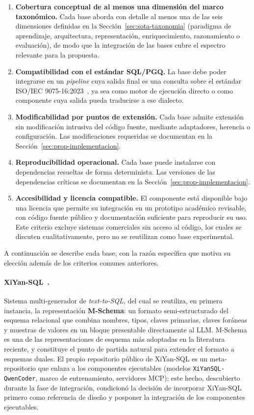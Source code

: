 \begin{enumerate}
    \item \textbf{Cobertura conceptual de al menos una dimensión del marco taxonómico.} Cada base aborda con detalle al menos una de las seis dimensiones definidas en la Sección~\ref{sec:sota-taxonomia} (paradigma de aprendizaje, arquitectura, representación, enriquecimiento, razonamiento o evaluación), de modo que la integración de las bases cubre el espectro relevante para la propuesta.
    \item \textbf{Compatibilidad con el estándar \ac{SQL}/\ac{PGQ}.} La base debe poder integrarse en un \emph{pipeline} cuya salida final es una consulta sobre el estándar ISO/IEC 9075-16:2023~\cite{ISO9075_16_2023}, ya sea como motor de ejecución directo o como componente cuya salida pueda traducirse a ese dialecto.
    \item \textbf{Modificabilidad por puntos de extensión.} Cada base admite extensión sin modificación intrusiva del código fuente, mediante adaptadores, herencia o configuración. Las modificaciones requeridas se documentan en la Sección~\ref{sec:prop-implementacion}.
    \item \textbf{Reproducibilidad operacional.} Cada base puede instalarse con dependencias resueltas de forma determinista. Las versiones de las dependencias críticas se documentan en la Sección~\ref{sec:prop-implementacion}.
    \item \textbf{Accesibilidad y licencia compatible.} El componente está disponible bajo una licencia que permite su integración en un prototipo académico revisable, con código fuente público y documentación suficiente para reproducir su uso. Este criterio excluye sistemas comerciales sin acceso al código, los cuales se discuten cualitativamente, pero no se reutilizan como base experimental.
\end{enumerate}

A continuación se describe cada base, con la razón específica que motiva su elección además de los criterios comunes anteriores.

\paragraph{XiYan-SQL~\cite{XiYan-SQL2024}.} Sistema multi-generador de \emph{text-to-SQL}, del cual se reutiliza, en primera instancia, la representación \textbf{M-Schema}: un formato semi-estructurado del esquema relacional que combina nombres, tipos, claves primarias, claves foráneas y muestras de valores en un bloque presentable directamente al \ac{LLM}. M-Schema es una de las representaciones de esquema más adoptadas en la literatura reciente, y constituye el punto de partida natural para extender el formato a esquemas duales. El propio repositorio público de XiYan-SQL es un meta-repositorio que enlaza a los componentes ejecutables (modelos \texttt{XiYanSQL-QwenCoder}, marco de entrenamiento, servidores MCP); este hecho, descubierto durante la fase de integración, condicionó la decisión de incorporar XiYan-SQL primero como referencia de diseño y posponer la integración de los componentes ejecutables. %

